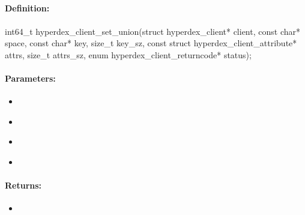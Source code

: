 \pagebreak
\subsection{}
\label{api:c:set_union}


\paragraph{Definition:}
\begin{ccode}
int64_t hyperdex_client_set_union(struct hyperdex_client* client,
        const char* space,
        const char* key, size_t key_sz,
        const struct hyperdex_client_attribute* attrs, size_t attrs_sz,
        enum hyperdex_client_returncode* status);
\end{ccode}

\paragraph{Parameters:}
\begin{itemize}[noitemsep]
\item {}\\

\item {}\\

\item {}\\

\item {}\\

\end{itemize}

\paragraph{Returns:}
\begin{itemize}[noitemsep]
\item {}\\

\end{itemize}

